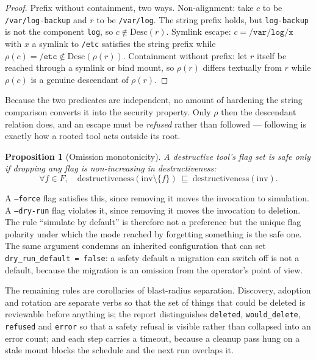 \documentclass[11pt]{article}
\newtheorem{prop}{Proposition}[section]
\begin{document}
\begin{proof}
Prefix without containment, two ways. Non-alignment: take $c$ to be
\texttt{/var/log-backup} and $r$ to be \texttt{/var/log}. The string prefix
holds, but \texttt{log-backup} is not the component \texttt{log}, so
$c \notin \mathrm{Desc}(r)$. Symlink escape: $c = \texttt{/var/log/x}$ with $x$ a symlink
to \texttt{/etc} satisfies the string prefix while $\rho(c) = \texttt{/etc}
\notin \mathrm{Desc}(\rho(r))$. Containment without prefix: let $r$ itself be
reached through a symlink or bind mount, so $\rho(r)$ differs textually from
$r$ while $\rho(c)$ is a genuine descendant of $\rho(r)$.
\end{proof}

Because the two predicates are independent, no amount of hardening the string
comparison converts it into the security property. Only $\rho$ then the
descendant relation does, and an escape must be \emph{refused} rather than
followed --- following is exactly how a rooted tool acts outside its root.

\begin{prop}[Omission monotonicity]
A destructive tool's flag set is safe only if dropping any flag is
non-increasing in destructiveness:
\begin{equation}
\forall f \in F, \quad \mathrm{destructiveness}(\mathrm{inv} \setminus \{f\})
\ \sqsubseteq\ \mathrm{destructiveness}(\mathrm{inv}).
\end{equation}
\end{prop}

A \texttt{--force} flag satisfies this, since removing it moves the invocation
to simulation. A \texttt{--dry-run} flag violates it, since removing it moves
the invocation to deletion. The rule ``simulate by default'' is therefore not a
preference but the unique flag polarity under which the mode reached by
forgetting something is the safe one. The same argument condemns an inherited
configuration that can set \texttt{dry\_run\_default = false}: a safety default
a migration can switch off is not a default, because the migration is an
omission from the operator's point of view.

The remaining rules are corollaries of blast-radius separation. Discovery,
adoption and rotation are separate verbs so that the set of things that could
be deleted is reviewable before anything is; the report distinguishes
\texttt{deleted}, \texttt{would\_delete}, \texttt{refused} and \texttt{error} so
that a safety refusal is visible rather than collapsed into an error count; and
each step carries a timeout, because a cleanup pass hung on a stale mount
blocks the schedule and the next run overlaps it.
\end{document}
